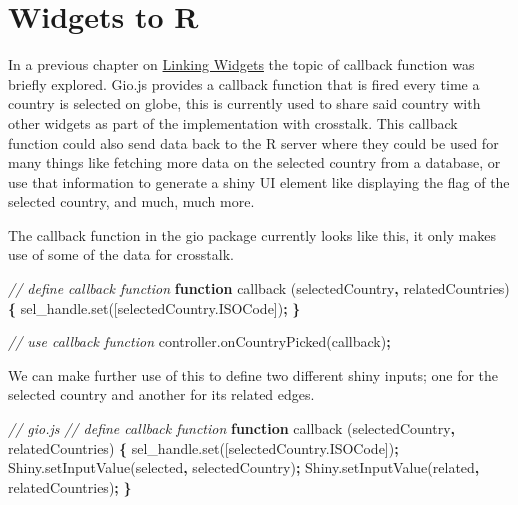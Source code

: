 \documentclass[
]{krantz}
\makeatletter
\newenvironment{Shaded}{\begin{snugshade}}{\end{snugshade}}
\newcommand{\AttributeTok}[1]{\textcolor[rgb]{0.61,0.61,0.61}{#1}}
\newcommand{\CommentTok}[1]{\textcolor[rgb]{0.37,0.37,0.37}{\textit{#1}}}
\newcommand{\KeywordTok}[1]{\textcolor[rgb]{0.27,0.27,0.27}{\textbf{#1}}}
\newcommand{\NormalTok}[1]{#1}
\newcommand{\OperatorTok}[1]{\textcolor[rgb]{0.43,0.43,0.43}{\textbf{#1}}}
\newcommand{\StringTok}[1]{\textcolor[rgb]{0.5,0.5,0.5}{#1}}
\newcommand{\VariableTok}[1]{\textcolor[rgb]{0,0,0}{#1}}
\newenvironment{kframe}{%
\medskip{}
\setlength{\fboxsep}{.8em}
 \def\at@end@of@kframe{}%
 \ifinner\ifhmode%
  \def\at@end@of@kframe{\end{minipage}}%
  \begin{minipage}{\columnwidth}%
 \fi\fi%
 \def\FrameCommand##1{\hskip\@totalleftmargin \hskip-\fboxsep
 \colorbox{shadecolor}{##1}\hskip-\fboxsep
     \hskip-\linewidth \hskip-\@totalleftmargin \hskip\columnwidth}%
 \MakeFramed {\advance\hsize-\width
   \@totalleftmargin\z@ \linewidth\hsize
   \@setminipage}}%
 {\par\unskip\endMakeFramed%
 \at@end@of@kframe}
\renewenvironment{Shaded}{\begin{kframe}}{\end{kframe}}
\makeatother
\begin{document}
\hypertarget{shiny-widgets-to-r}{%
\section{Widgets to R}\label{shiny-widgets-to-r}}

In a previous chapter on \protect\hyperlink{linking-widgets}{Linking Widgets} the topic of callback function was briefly explored. Gio.js provides a callback function that is fired every time a country is selected on globe, this is currently used to share said country with other widgets as part of the implementation with crosstalk. This callback function could also send data back to the R server where they could be used for many things like fetching more data on the selected country from a database, or use that information to generate a shiny UI element like displaying the flag of the selected country, and much, much more.

The callback function in the gio package currently looks like this, it only makes use of some of the data for crosstalk.

\begin{Shaded}
\begin{Highlighting}[]
\CommentTok{// define callback function}
\KeywordTok{function} \AttributeTok{callback}\NormalTok{ (selectedCountry}\OperatorTok{,}\NormalTok{ relatedCountries) }\OperatorTok{\{}
  \VariableTok{sel\_handle}\NormalTok{.}\AttributeTok{set}\NormalTok{([}\VariableTok{selectedCountry}\NormalTok{.}\AttributeTok{ISOCode}\NormalTok{])}\OperatorTok{;}
\OperatorTok{\}}

\CommentTok{// use callback function}
\VariableTok{controller}\NormalTok{.}\AttributeTok{onCountryPicked}\NormalTok{(callback)}\OperatorTok{;}
\end{Highlighting}
\end{Shaded}

We can make further use of this to define two different shiny inputs; one for the selected country and another for its related edges.

\begin{Shaded}
\begin{Highlighting}[]
\CommentTok{// gio.js}
\CommentTok{// define callback function}
\KeywordTok{function} \AttributeTok{callback}\NormalTok{ (selectedCountry}\OperatorTok{,}\NormalTok{ relatedCountries) }\OperatorTok{\{}
  \VariableTok{sel\_handle}\NormalTok{.}\AttributeTok{set}\NormalTok{([}\VariableTok{selectedCountry}\NormalTok{.}\AttributeTok{ISOCode}\NormalTok{])}\OperatorTok{;}
  \VariableTok{Shiny}\NormalTok{.}\AttributeTok{setInputValue}\NormalTok{(}\StringTok{\textquotesingle{}selected\textquotesingle{}}\OperatorTok{,}\NormalTok{ selectedCountry)}\OperatorTok{;}
  \VariableTok{Shiny}\NormalTok{.}\AttributeTok{setInputValue}\NormalTok{(}\StringTok{\textquotesingle{}related\textquotesingle{}}\OperatorTok{,}\NormalTok{ relatedCountries)}\OperatorTok{;}
\OperatorTok{\}}
\end{Highlighting}
\end{Shaded}
\end{document}
